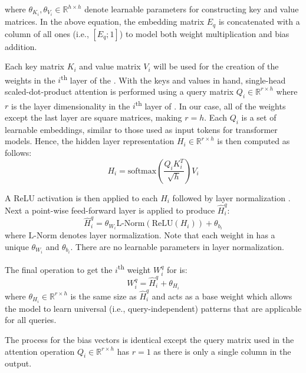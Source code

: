 \documentclass[sigconf,]{acmart}
\begin{document}
where $\theta_{K_i}, \theta_{V_i} \in \mathbb{R}^{h \times h}$  denote learnable parameters for constructing key and value matrices. In the above equation, the embedding matrix $E_q$ is concatenated with a column of all ones (i.e., $[E_q; 1]$) to model both weight multiplication and bias addition.

Each key matrix $K_i$ and value matrix $V_i$ will be used for the creation of the weights in the $i$\textsuperscript{th} layer of the \mininame{}. With the keys and values in hand, single-head scaled-dot-product attention \cite{AttentionIsAllYouNeed} is performed using a query matrix $Q_i \in \mathbb{R}^{r \times h}$ where $r$ is the layer dimensionality in the $i$\textsuperscript{th} layer of \mininame{}. In our case, all of the weights except the last layer are square matrices, making $r=h$. Each $Q_i$ is a set of learnable embeddings, similar to those used as input tokens for transformer models. Hence, the hidden layer representation $H_i \in \mathbb{R}^{r \times h}$ is then computed as follows:
\begin{equation}
    H_i = \text{softmax} \left(\frac{Q_i K_i^T}{\sqrt{h}} \right) V_i
\end{equation}

A ReLU activation \cite{ReLU} is then applied to each $H_i$ followed by layer normalization \cite{LayerNorm}. Next a point-wise feed-forward layer is applied to produce $\widehat{H}^q_i$:
\begin{equation}
    \widehat{H}^q_i = \theta_{W_i} \text{L-Norm}\left(\text{ReLU}(H_i)\right) + \theta_{b_i}
\end{equation}
where $\text{L-Norm}$ denotes layer normalization. Note that each weight in \mininame{} has a unique $\theta_{W_i}$ and $\theta_{b_i}$. There are no learnable parameters in layer normalization.

The final operation to get the $i$\textsuperscript{th} weight $W^q_i$ for \mininame{} is:
\begin{equation}
    W^q_i = \widehat{H}^q_i + \theta_{H_i}
\end{equation}
where $\theta_{H_i} \in \mathbb{R}^{r \times h}$ is the same size as $\widehat{H}^q_i$ and acts as a base weight which allows the model to learn universal (i.e., query-independent) patterns that are applicable for all queries.

The process for the bias vectors is identical except the query matrix used in the attention operation $Q_i \in \mathbb{R} ^ {r \times h}$ has $r=1$ as there is only a single column in the output.
\end{document}
